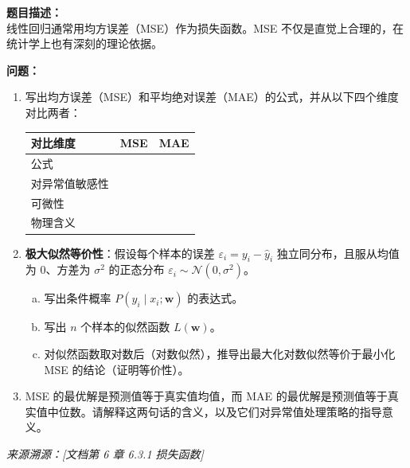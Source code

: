 \documentclass[a4paper,11pt]{ctexart}
\begin{document}
\begin{problembox}
    \textbf{题目描述：}\\
    线性回归通常用均方误差（MSE）作为损失函数。MSE 不仅是直觉上合理的，在统计学上也有深刻的理论依据。

    \vspace{0.3cm}
    \textbf{问题：}
    \begin{enumerate}[(1)]
        \item 写出均方误差（MSE）和平均绝对误差（MAE）的公式，并从以下四个维度对比两者：

        \begin{center}
        \begin{tabular}{p{3cm} p{4.5cm} p{4.5cm}}
            \toprule
            对比维度 & MSE & MAE \\
            \midrule
            公式 & \underline{\hspace{4cm}} & \underline{\hspace{4cm}} \\[1.2em]
            对异常值敏感性 & \underline{\hspace{4cm}} & \underline{\hspace{4cm}} \\[1.2em]
            可微性 & \underline{\hspace{4cm}} & \underline{\hspace{4cm}} \\[1.2em]
            物理含义 & \underline{\hspace{4cm}} & \underline{\hspace{4cm}} \\
            \bottomrule
        \end{tabular}
        \end{center}

        \item \textbf{极大似然等价性}：假设每个样本的误差 $\varepsilon_i = y_i - \hat{y}_i$ 独立同分布，且服从均值为 0、方差为 $\sigma^2$ 的正态分布 $\varepsilon_i \sim \mathcal{N}(0, \sigma^2)$。
        \begin{enumerate}[a.]
            \item 写出条件概率 $P(y_i \mid x_i; \boldsymbol{w})$ 的表达式。
            \item 写出 $n$ 个样本的似然函数 $L(\boldsymbol{w})$。
            \item 对似然函数取对数后（对数似然），推导出最大化对数似然等价于最小化 MSE 的结论（证明等价性）。
        \end{enumerate}

        \item MSE 的最优解是预测值等于真实值均值，而 MAE 的最优解是预测值等于真实值中位数。请解释这两句话的含义，以及它们对异常值处理策略的指导意义。
    \end{enumerate}
    {\color{gray}\small\textit{来源溯源：[文档第 6 章 6.3.1 损失函数]}}
\end{problembox}
\end{document}
